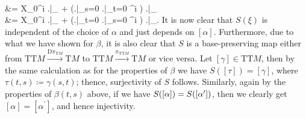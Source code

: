 \documentclass[a4paper,oneside,11pt,bibliography=totoc]{scrartcl}
\theoremstyle{plain}
\theoremstyle{remark}
\theoremstyle{definition}
\begin{document}
\\
&=
X_0^i \mleft.\mright|_{\omega}
	+ \mleft(\mleft.\mright|_{s=0} \mleft.\mright|_{t=0} \alpha^i \mright) \mleft.\mright|_{\omega}
\\
&=
X_0^i \mleft.\mright|_{\omega}
	+ \mleft(\mleft.\mright|_{t=0} \mleft.\mright|_{s=0} \alpha^i \mright) \mleft.\mright|_{\omega}.
\eas
It is now clear that $S(\xi)$ is independent of the choice of $\alpha$ and just depends on $[\alpha]$. Furthermore, due to what we have shown for $\beta$, it is also clear that $S$ is a base-preserving map either from $\mathrm{TT}M \stackrel{\mathrm{D}\pi_{\mathrm{T}M}}{\to} \mathrm{T}M$ to $\mathrm{TT}M \stackrel{\pi_{\mathrm{TT}M}}{\to} \mathrm{T}M$ or vice versa. Let $[\gamma] \in \mathrm{TT}M$, then by the same calculation as for the properties of $\beta$ we have $S([\tau]) = [\gamma]$, where $\tau(t, s) \coloneqq \gamma(s, t)$; thence, surjectivity of $S$ follows. Similarly, again by the properties of $\beta(t, s)$ above, if we have $S([\alpha]) = S\mleft( \mleft[ \alpha^\prime \mright] \mright)$, then we clearly get $[\alpha] = [\alpha^\prime]$, and hence injectivity.
\end{document}
